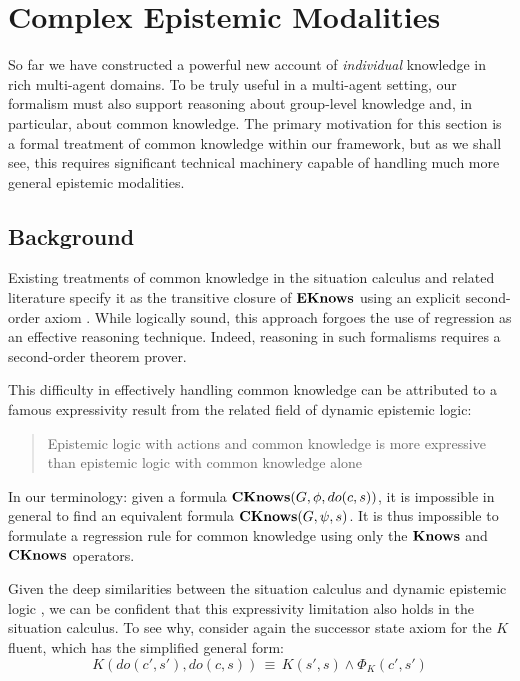 

\chapter{Complex Epistemic Modalities}

\label{ch:cknowledge}

So far we have constructed a powerful new account of \emph{individual}
knowledge in rich multi-agent domains. To be truly useful in a multi-agent
setting, our formalism must also support reasoning about group-level
knowledge and, in particular, about common knowledge. The primary
motivation for this section is a formal treatment of common knowledge
within our framework, but as we shall see, this requires significant
technical machinery capable of handling much more general epistemic
modalities.


\section{Background}

Existing treatments of common knowledge in the situation calculus
and related literature specify it as the transitive closure of $\mathbf{EKnows}$
using an explicit second-order axiom \citep{davis05fo_ma_theory,ghaderi07sc_joint_ability}.
While logically sound, this approach forgoes the use of regression
as an effective reasoning technique. Indeed, reasoning in such formalisms
requires a second-order theorem prover.

This difficulty in effectively handling common knowledge can be attributed
to a famous expressivity result from the related field of dynamic
epistemic logic:

\begin{quote}
Epistemic logic with actions and common knowledge is more expressive
than epistemic logic with common knowledge alone \citep{baltag98pa_ck} 
\end{quote}
In our terminology: given a formula $\mathbf{CKnows}(G,\phi,do(c,s))$, it
is impossible in general to find an equivalent formula $\mathbf{CKnows}(G,\psi,s)$.
It is thus impossible to formulate a regression rule for common knowledge
using only the $\mathbf{Knows}$ and $\mathbf{CKnows}$ operators.

Given the deep similarities between the situation calculus and dynamic
epistemic logic \citep{vanbentham07ml_sitcalc}, we can be confident
that this expressivity limitation also holds in the situation calculus.
To see why, consider again the successor state axiom for the $K$
fluent, which has the simplified general form:\[
K(do(c',s'),do(c,s))\,\equiv\, K(s',s)\wedge\Phi_{K}(c',s')\]


